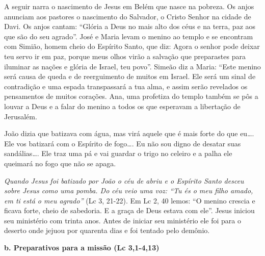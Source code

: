 \documentclass[
]{book}
\begin{document}
A seguir narra o nascimento de Jesus em Belém que nasce na pobreza. Os anjos anunciam aos pastores o nascimento do Salvador, o Cristo Senhor na cidade de Davi. Os anjos cantam: ``Glória a Deus no mais alto dos céus e na terra, paz aos que são do seu agrado''. José e Maria levam o menino ao templo e se encontram com Simião, homem cheio do Espírito Santo, que diz: Agora o senhor pode deixar teu servo ir em paz, porque meus olhos virão a salvação que preparastes para iluminar as nações e glória de Israel, teu povo''. Simeão diz a Maria: ``Este menino será causa de queda e de reerguimento de muitos em Israel. Ele será um sinal de contradição e uma espada transpassará a tua alma, e assim serão revelados os pensamentos de muitos corações. Ana, uma profetiza do templo também se pôs a louvar a Deus e a falar do menino a todos os que esperavam a libertação de Jerusalém.

João dizia que batizava com água, mas virá aquele que é mais forte do que eu\ldots. Ele vos batizará com o Espírito de fogo\ldots. Eu não sou digno de desatar suas sandálias\ldots. Ele traz uma pá e vai guardar o trigo no celeiro e a palha ele queimará no fogo que não se apaga.

\emph{Quando Jesus foi batizado por João o céu de abriu e o Espírito Santo desceu sobre Jesus como uma pomba. Do céu veio uma voz: ``Tu és o meu filho amado, em ti está o meu agrado''} (Lc 3, 21-22). Em Lc 2, 40 lemos: ``O menino crescia e ficava forte, cheio de sabedoria. E a graça de Deus estava com ele''. Jesus iniciou seu ministério com trinta anos. Antes de iniciar seu ministério ele foi para o deserto onde jejuou por quarenta dias e foi tentado pelo demônio.

\textbf{b. Preparativos para a missão (Lc 3,1-4,13)}
\end{document}
